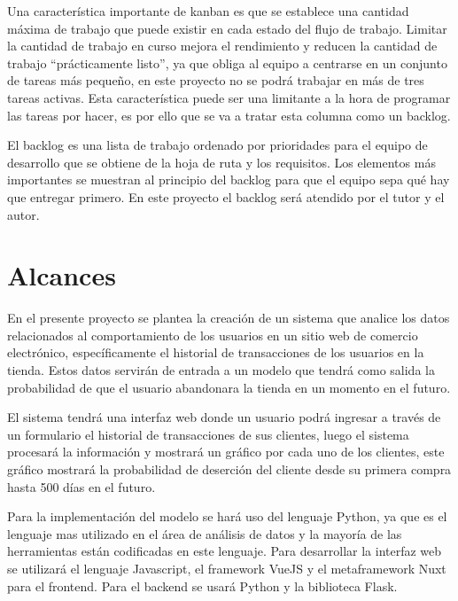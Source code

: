 	Una característica importante de kanban es que se establece una cantidad máxima de trabajo que puede existir en cada estado del flujo de trabajo. Limitar la cantidad de trabajo en curso mejora el rendimiento y reducen la cantidad de trabajo “prácticamente listo”, ya que obliga al equipo a centrarse en un conjunto de tareas más pequeño, en este proyecto no se podrá trabajar en más de tres tareas activas. Esta característica puede ser una limitante a la hora de programar las tareas por hacer, es por ello que se va a tratar esta columna como un backlog.


	El backlog es una lista de trabajo ordenado por prioridades para el equipo de desarrollo que se obtiene de la hoja de ruta y los requisitos. Los elementos más importantes se muestran al principio del backlog para que el equipo sepa qué hay que entregar primero. En este proyecto el backlog será atendido por el tutor y el autor.

\section{Alcances}

En el presente proyecto se plantea la creación de un sistema que analice los datos relacionados al comportamiento de los usuarios en un sitio web de comercio electrónico, específicamente el historial de transacciones de los usuarios en la tienda. Estos datos servirán de entrada a un modelo que tendrá como salida la probabilidad de que el usuario abandonara la tienda en un momento en el futuro.

El sistema tendrá una interfaz web donde un usuario podrá ingresar a través de un formulario el historial de transacciones de sus clientes, luego el sistema procesará la información y mostrará un gráfico por cada uno de los clientes, este gráfico mostrará la probabilidad de deserción del cliente desde su primera compra hasta 500 días en el futuro.

Para la implementación del modelo se hará uso del lenguaje Python, ya que es el lenguaje mas utilizado en el área de análisis de datos y la mayoría de las herramientas están codificadas en este lenguaje. Para desarrollar la interfaz web se utilizará el lenguaje Javascript, el framework VueJS y el metaframework Nuxt para el frontend. Para el backend se usará Python y la biblioteca Flask.  